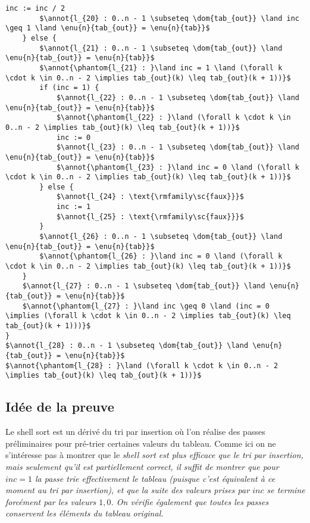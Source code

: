 \documentclass[a4paper, 11pt]{article}
\DeclareMathOperator{\eenu}{Enum}
\DeclareMathOperator{\ddom}{Dom}
\newcommand{\dom}[1]{\ddom\left(#1\right)}
\newcommand{\enu}[2]{\eenu_{\substack{#1}}\left(#2\right)}
\theoremstyle{mystyle}
\newcommand{\annot}[1]{{\color{black} #1}}
\begin{document}
\begin{lstlisting}[language=prooflang, mathescape,
    basicstyle=\ttfamily\large\color{blue!90!black},
    keywordstyle=\bfseries,
    tabsize=4]
        inc := inc / 2
        $\annot{l_{20} : 0..n - 1 \subseteq \dom{tab_{out}} \land inc \geq 1 \land \enu{n}{tab_{out}} = \enu{n}{tab}}$
    } else {
        $\annot{l_{21} : 0..n - 1 \subseteq \dom{tab_{out}} \land \enu{n}{tab_{out}} = \enu{n}{tab}}$
        $\annot{\phantom{l_{21} : }\land inc = 1 \land (\forall k \cdot k \in 0..n - 2 \implies tab_{out}(k) \leq tab_{out}(k + 1))}$
        if (inc = 1) {
            $\annot{l_{22} : 0..n - 1 \subseteq \dom{tab_{out}} \land \enu{n}{tab_{out}} = \enu{n}{tab}}$
            $\annot{\phantom{l_{22} : }\land (\forall k \cdot k \in 0..n - 2 \implies tab_{out}(k) \leq tab_{out}(k + 1))}$
            inc := 0
            $\annot{l_{23} : 0..n - 1 \subseteq \dom{tab_{out}} \land \enu{n}{tab_{out}} = \enu{n}{tab}}$
            $\annot{\phantom{l_{23} : }\land inc = 0 \land (\forall k \cdot k \in 0..n - 2 \implies tab_{out}(k) \leq tab_{out}(k + 1))}$
        } else {
            $\annot{l_{24} : \text{\rmfamily\sc{faux}}}$
            inc := 1
            $\annot{l_{25} : \text{\rmfamily\sc{faux}}}$
        }
        $\annot{l_{26} : 0..n - 1 \subseteq \dom{tab_{out}} \land \enu{n}{tab_{out}} = \enu{n}{tab}}$
        $\annot{\phantom{l_{26} : }\land inc = 0 \land (\forall k \cdot k \in 0..n - 2 \implies tab_{out}(k) \leq tab_{out}(k + 1))}$
    }
    $\annot{l_{27} : 0..n - 1 \subseteq \dom{tab_{out}} \land \enu{n}{tab_{out}} = \enu{n}{tab}}$
    $\annot{\phantom{l_{27} : }\land inc \geq 0 \land (inc = 0 \implies (\forall k \cdot k \in 0..n - 2 \implies tab_{out}(k) \leq tab_{out}(k + 1)))}$
}
$\annot{l_{28} : 0..n - 1 \subseteq \dom{tab_{out}} \land \enu{n}{tab_{out}} = \enu{n}{tab}}$
$\annot{\phantom{l_{28} : }\land (\forall k \cdot k \in 0..n - 2 \implies tab_{out}(k) \leq tab_{out}(k + 1))}$
\end{lstlisting}

\subsection{Idée de la preuve}

Le  shell sort est un dérivé du tri par insertion où l'on réalise des passes préliminaires pour pré-trier certaines valeurs du tableau. Comme ici on ne s'intéresse pas à montrer que le \it{shell sort} est plus efficace que le tri par insertion, mais seulement qu'il est partiellement correct, il suffit de montrer que pour $inc = 1$ la passe trie effectivement le tableau (puisque c'est équivalent à ce moment au tri par insertion), et que la suite des valeurs prises par $inc$ se termine forcément par les valeurs $1, 0$. On vérifie également que toutes les passes conservent les éléments du tableau original.
\end{document}
